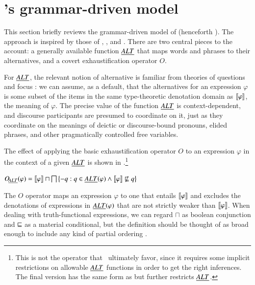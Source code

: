 \documentclass[leqno,12pt]{article}
\begin{document}

\section{\CFS's grammar-driven model}\label{sec:cfs}

This section briefly reviews the grammar-driven model of
\citet{ChierchiaFoxSpector08} (henceforth \CFS).  The approach is
inspired by those of \citet{Chierchia01}, 
\citet{Spector:2007}, and \citet{Fox:2007,Fox:2009}. There are two
central pieces to the account: a generally available function $\emph{ALT}$
that maps words and phrases to their alternatives, and a covert
exhaustification operator $O$.

For $\emph{ALT}$, the relevant notion of alternative is familiar from
theories of questions and focus \citep{Groenendijk84,Rooth85,Rooth92}:
we can assume, as a default, that the alternatives for an expression
$\varphi$ is some subset of the items in the same type-theoretic
denotation domain as $\llbracket\varphi\rrbracket$, the meaning of $\varphi$.  The
precise value of the function $\emph{ALT}$ is context-dependent, and
discourse participants are presumed to coordinate on it, just as they
coordinate on the meanings of deictic or discourse-bound pronouns,
elided phrases, and other pragmatically controlled free variables.

The effect of applying the basic exhaustification operator $O$ to an
expression $\varphi$ in the context of a given $\emph{ALT}$ is shown in
\citep{Spector:2007,Fox:2007,Fox:2009,Magri:2009,ChierchiaFoxSpector08}.\footnote{This
  is not the operator that \CFS\ ultimately favor, since it
  requires some implicit restrictions on allowable $\emph{ALT}$ functions in
  order to get the right inferences.  The final version has the same
  form as  but further restricts $\emph{ALT}$.}
%
\begin{examples}
\item\label{def:O}
  $\OALT(\varphi) = 
  \sem{\varphi} \sqcap \bigsqcap\set{ -q : q \in \ALT(\varphi) \wedge \sem{\varphi} \not\entails q}$ 
\end{examples}
%
The $O$ operator maps an expression $\varphi$ to one that entails
$\llbracket\varphi\rrbracket$ and excludes the denotations of expressions in
$\emph{ALT}(\varphi)$ that are not strictly weaker than $\llbracket\varphi\rrbracket$. When
dealing with truth-functional expressions, we can regard $\sqcap$ as
boolean conjunction and $\sqsubseteq$ as a material conditional, but the
definition should be thought of as broad enough to include any kind of
partial ordering .
\end{document}
